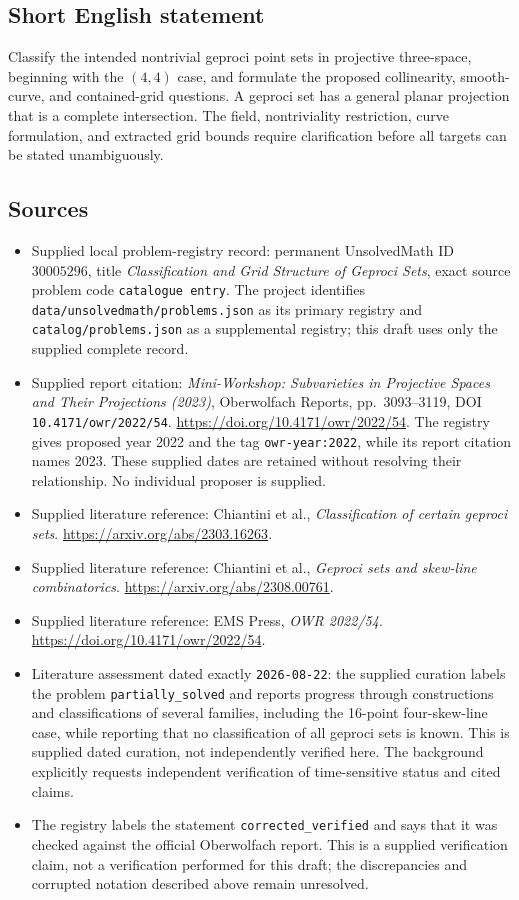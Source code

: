 \documentclass[11pt]{article}
\begin{document}
\subsection{Short English statement}
Classify the intended nontrivial geproci point sets in projective three-space, beginning with the \((4,4)\) case, and formulate the proposed collinearity, smooth-curve, and contained-grid questions. A geproci set has a general planar projection that is a complete intersection. The field, nontriviality restriction, curve formulation, and extracted grid bounds require clarification before all targets can be stated unambiguously.
\subsection{Sources}
\begin{itemize}
\item Supplied local problem-registry record: permanent UnsolvedMath ID \(30005296\), title \emph{Classification and Grid Structure of Geproci Sets}, exact source problem code \texttt{catalogue entry}. The project identifies \texttt{data/unsolvedmath/problems.json} as its primary registry and \texttt{catalog/problems.json} as a supplemental registry; this draft uses only the supplied complete record.
\item Supplied report citation: \emph{Mini-Workshop: Subvarieties in Projective Spaces and Their Projections (2023)}, Oberwolfach Reports, pp.\ 3093--3119, DOI \texttt{10.4171/owr/2022/54}. \url{https://doi.org/10.4171/owr/2022/54}. The registry gives proposed year 2022 and the tag \texttt{owr-year:2022}, while its report citation names 2023. These supplied dates are retained without resolving their relationship. No individual proposer is supplied.
\item Supplied literature reference: Chiantini et al., \emph{Classification of certain geproci sets}. \url{https://arxiv.org/abs/2303.16263}.
\item Supplied literature reference: Chiantini et al., \emph{Geproci sets and skew-line combinatorics}. \url{https://arxiv.org/abs/2308.00761}.
\item Supplied literature reference: EMS Press, \emph{OWR 2022/54}. \url{https://doi.org/10.4171/owr/2022/54}.
\item Literature assessment dated exactly \texttt{2026-08-22}: the supplied curation labels the problem \texttt{partially\_solved} and reports progress through constructions and classifications of several families, including the 16-point four-skew-line case, while reporting that no classification of all geproci sets is known. This is supplied dated curation, not independently verified here. The background explicitly requests independent verification of time-sensitive status and cited claims.
\item The registry labels the statement \texttt{corrected\_verified} and says that it was checked against the official Oberwolfach report. This is a supplied verification claim, not a verification performed for this draft; the discrepancies and corrupted notation described above remain unresolved.
\end{itemize}
\end{document}

